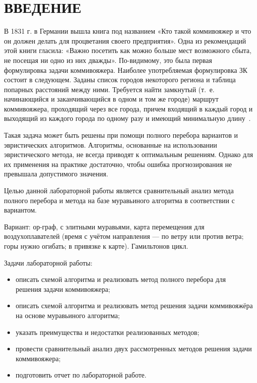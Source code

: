 \section*{ВВЕДЕНИЕ}

В 1831 г. в Германии вышла книга под названием «Кто такой коммивояжер и что он должен делать для процветания своего предприятия».
Одна из рекомендаций этой книги гласила: «Важно посетить как можно больше мест возможного сбыта, не посещая ни одно из них дважды».
По-видимому, это была первая формулировка задачи коммивояжера. 
Наиболее употребляемая формулировка ЗК состоит в следующем. 
Заданы список городов некоторого региона и таблица попарных расстояний между ними.
Требуется найти замкнутый (т.~е. начинающийся и заканчивающийся в одном и том же городе) маршрут коммивояжера, проходящий через все города, причем входящий в каждый город и выходящий из каждого города по одному разу и имеющий минимальную длину~\cite{меламед1989задача}.

Такая задача может быть решены при помощи полного перебора вариантов и эвристических алгоритмов.
Алгоритмы, основанные на использовании эвристического метода, не всегда приводят к оптимальным решениям.
Однако для их применения на практике достаточно, чтобы ошибка прогнозирования не превышала допустимого значения.

Целью данной лабораторной работы является сравнительный анализ метода полного перебора и метода на базе муравьиного алгоритма в соответствии с вариантом.

Вариант: ор-граф, с элитными муравьями, карта перемещения для воздухоплавателей (время с учётом направления --- по ветру или против ветра; горы нужно огибать; в привязке к карте). 
Гамильтонов цикл.

Задачи лабораторной работы:
\begin{itemize}[label*=---]
	\item описать схемой алгоритма и реализовать метод полного перебора для решения задачи коммивояжера;
	\item описать схемой алгоритма и реализовать метод решения задачи коммивояжёра на основе муравьиного алгоритма;
	\item указать преимущества и недостатки реализованных методов;
	\item провести сравнительный анализ двух рассмотренных методов решения задачи коммивояжера;
	\item подготовить отчет по лабораторной работе.
\end{itemize}